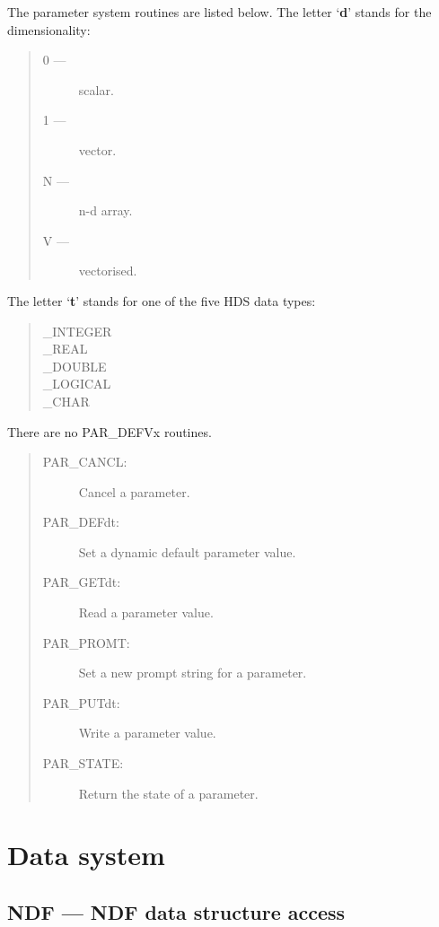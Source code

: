 The parameter system routines are listed below.
The letter `{\bf d}' stands for the dimensionality:
\begin{quote}
\begin{description}
\item [0 ---] scalar.
\item [1 ---] vector.
\item [N ---] n-d array.
\item [V ---] vectorised.
\end{description}
\end{quote}
The letter `{\bf t}' stands for one of the five HDS data types:
\begin{quote}
\begin{description}
\item [\_INTEGER]
\item [\_REAL]
\item [\_DOUBLE]
\item [\_LOGICAL]
\item [\_CHAR]
\end{description}
\end{quote}
There are no PAR\_DEFVx routines.
\begin{quote}
\begin{description}
\item [PAR\_CANCL:]  Cancel a parameter.
\item [PAR\_DEFdt:]  Set a dynamic default parameter value.
\item [PAR\_GETdt:]  Read a parameter value.
\item [PAR\_PROMT:]  Set a new prompt string for a parameter.
\item [PAR\_PUTdt:]  Write a parameter value.
\item [PAR\_STATE:]  Return the state of a parameter.
\end{description}
\end{quote}

\newpage

\section{Data system}

\subsection{NDF --- NDF data structure access}
\label{R_NDF}

\vspace{-9mm}

